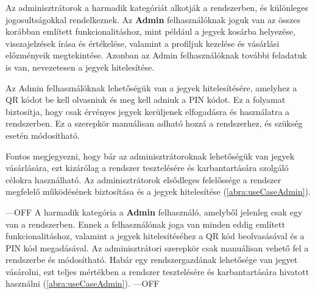 \begin{itemize}
Az adminisztrátorok a harmadik kategóriát alkotják a rendszerben, és különleges jogosultságokkal rendelkeznek. Az \textbf{Admin} felhasználóknak joguk van az összes korábban említett funkcionalitáshoz, mint például a jegyek kosárba helyezése, visszajelzések írása és értékelése, valamint a profiljuk kezelése és vásárlási előzményeik megtekintése. Azonban az Admin felhasználóknak további feladatuk is van, nevezetesen a jegyek hitelesítése.

Az Admin felhasználóknak lehetőségük van a jegyek hitelesítésére, amelyhez a QR kódot be kell olvasniuk és meg kell adniuk a PIN kódot. Ez a folyamat biztosítja, hogy csak érvényes jegyek kerüljenek elfogadásra és használatra a rendszerben. Ez a szerepkör manuálisan adható hozzá a rendszerhez, és szükség esetén módosítható.

Fontos megjegyezni, hogy bár az adminisztrátoroknak lehetőségük van jegyek vásárlására, ezt kizárólag a rendszer tesztelésére és karbantartására szolgáló célokra használható. Az adminisztrátorok elsődleges felelőssége a rendszer megfelelő működésének biztosítása és a jegyek hitelesítése (\ref{abra:useCaseAdmin}).

---OFF
A harmadik kategória a \textbf{Admin} felhasználó, amelyből jelenleg csak egy van a rendszerben. Ennek a felhasználónak joga van minden eddig említett funkcionalitáshoz, valamint a jegyek hitelesítéséhez a QR kód beolvasásával és a PIN kód megadásával. Az adminisztrátori szerepkör csak manuálisan vehető fel a rendszerbe és módosítható. Habár egy rendszergazdának lehetősége van jegyet vásárolni, ezt teljes mértékben a rendszer tesztelésére és karbantartására hivatott használni (\ref{abra:useCaseAdmin}).
---OFF


\end{itemize}
